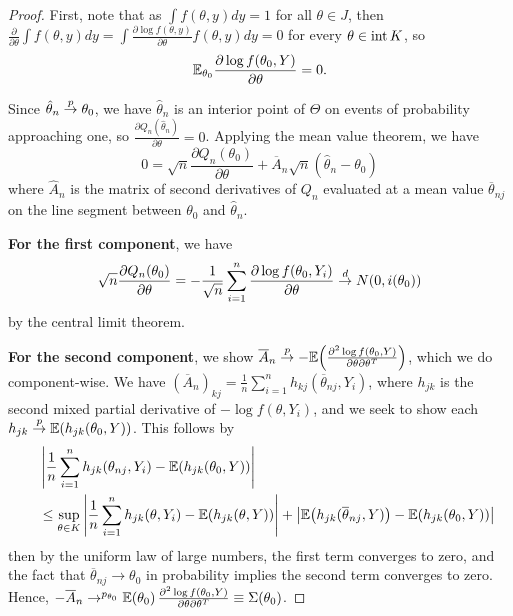 \begin{proof}
  First, note that as $\int f(\theta, y) dy = 1$ for all $\theta \in
  J$, then $\frac{\partial}{\partial \theta} \int f(\theta, y) dy =
  \int \frac{\partial \log f(\theta, y)}{\partial \theta} f(\theta, y)
  dy= 0$
  for every $\theta \in \operatorname*{int} K$, so
  \begin{align}
    \label{eq:47}
    \E_{\theta_{0}} \frac{\partial \log f(\theta_{0}, Y)}{\partial
      \theta}  = 0.
  \end{align}

  Since $\hat \theta_{n} \overset{p}{\rightarrow} \theta_{0}$, we have $\hat \theta_{n}$ is
  an interior point of $\Theta$ on events of probability approaching
  one, so $\frac{\partial Q_{n}(\hat \theta_{n})}{\partial \theta} =
  0$.  Applying the mean value theorem, we have
  \begin{equation}
    \label{eq:48}
    0 = \sqrt{n} \frac{\partial Q_{n}(\theta_{0})}{\partial \theta}  +
    \overline A_{n} \sqrt{n}(\hat \theta_{n} - \theta_{0})
  \end{equation} where $\hat A_{n}$ is the matrix of second
  derivatives of $Q_{n}$ evaluated at a mean value $\overline
  \theta_{nj}$ on the line segment between $\theta_{0}$ and $\hat
  \theta_{n}$.

  \textbf{For the first component}, we have
  \begin{align}
    \label{eq:49}
    \sqrt{n} \frac{\partial Q_{n}(\theta_{0})}{\partial \theta} = -
    \frac{1}{\sqrt{n}} \sum_{i=1}^{n} \frac{\partial \log
      f(\theta_{0}, Y_{i})}{\partial \theta} \overset{d}{\rightarrow} N(0, i(\theta_{0}))
  \end{align} by the central limit theorem.

  \textbf{For the second component}, we show $\overline A_{n} \cp
  -\E{\frac{\partial^{2} \log f(\theta_{0}, Y)}{\partial
      \theta \partial \theta^{T}}}$, which we do component-wise. We
  have $(\overline A_{n})_{kj} = \frac{1}{n} \sum_{i=1}^{n}
  h_{kj}(\overline \theta_{nj}, Y_{i})$, where $h_{jk}$ is the second
  mixed partial derivative of $-\log f(\theta, Y_{i})$, and we seek to
  show each $h_{jk} \cp \E{h_{jk}(\theta_{0}, Y)}$. This follows by
  \begin{align}
    \label{eq:52}
    &\left| \frac{1}{n} \sum_{i=1}^{n} h_{jk}(\theta_{nj}, Y_{i}) -
      \E{h_{jk}(\theta_{0}, Y)} \right| \\
    \quad &\leq \sup_{\theta \in K}
    \left| \frac{1}{n} \sum_{i=1}^{n} h_{jk}(\theta, Y_{i}) -
      \E{h_{jk}(\theta, Y)}\right| + \left| \E{h_{jk}(\overline
        \theta_{nj}, Y)} - \E{h_{jk}(\theta_{0}, Y)} \right|
  \end{align} then by the uniform law of large numbers, the first term
  converges to zero, and the fact that $\overline \theta_{nj}
  \rightarrow \theta_{0}$ in probability implies the second term
  converges to zero.  Hence, $-\overline A_{n}
  \rightarrow^{p_{\theta_{0}}} \E{\theta_{0}} \frac{\partial^{2} \log
    f(\theta_{0}, Y)}{\partial \theta \partial \theta^{T}} \equiv
  \Sigma(\theta_{0})$.


\end{proof}
